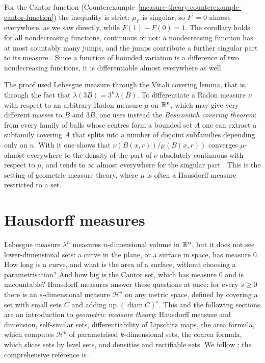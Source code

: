 For the Cantor function (Counterexample~\ref{measure-theory:counterexample-cantor-function}) the inequality is strict: $\mu_F$ is singular, so $F^{\prime} = 0$ almost everywhere, as we saw directly,
while $F(1) - F(0) = 1$. The corollary holds for all nondecreasing functions, continuous or not: a nondecreasing function has at most countably many jumps, and the jumps contribute a further singular
part to its measure \cite[Chapter 7]{rudin-rca}. Since a function of bounded variation is a difference of two nondecreasing functions, it is differentiable almost everywhere as well.

\begin{remark}\label{measure-theory:remark-besicovitch}
The proof used Lebesgue measure through the Vitali covering lemma, that is, through the fact that $\lambda(3B) = 3^n\lambda(B)$. To differentiate a Radon measure $\nu$ with respect to an arbitrary Radon
measure $\mu$ on $\mathbb{R}^n$, which may give very different masses to $B$ and $3B$, one uses instead the \emph{Besicovitch covering theorem}: from every family of balls whose centres form a bounded set
$A$ one can extract a subfamily covering $A$ that splits into a number of disjoint subfamilies depending only on $n$. With it one shows that $\nu(B(x, r))/\mu(B(x, r))$ converges $\mu$-almost
everywhere to the density of the part of $\nu$ absolutely continuous with respect to $\mu$, and tends to $\infty$ almost everywhere for the singular part \cite[Chapter 1]{evans-gariepy}. This is the
setting of geometric measure theory, where $\mu$ is often a Hausdorff measure restricted to a set.
\end{remark}

\section{Hausdorff measures}\label{measure-theory:section-hausdorff}

Lebesgue measure $\lambda^n$ measures $n$-dimensional volume in $\mathbb{R}^n$, but it does not see lower-dimensional sets: a curve in the plane, or a surface in space, has measure $0$. How long is
a curve, and what is the area of a surface, without choosing a parametrisation? And how big is the Cantor set, which has measure $0$ and is uncountable? Hausdorff measures answer these
questions at once: for every $s \geq 0$ there is an $s$-dimensional measure $\mathcal{H}^s$ on any metric space, defined by covering a set with small sets $C$ and adding up
$(\operatorname{diam}C)^s$. This and the following sections are an introduction to \emph{geometric measure theory}: Hausdorff measure and dimension, self-similar sets, differentiability of
Lipschitz maps, the area formula, which computes $\mathcal{H}^k$ of parametrised $k$-dimensional sets, the coarea formula, which slices sets by level sets, and densities and rectifiable sets. We follow \cite[Chapters 2--3]{evans-gariepy}; the comprehensive reference is
\cite{federer-gmt}.

